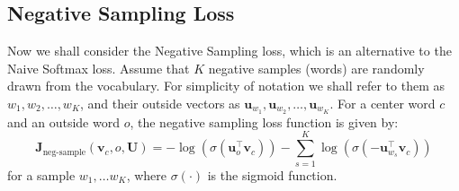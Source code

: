 \documentclass{assignment format}
\begin{document}
\subsection{Negative Sampling Loss}
Now we shall consider the Negative Sampling loss, which is an alternative to the Naive Softmax loss.  Assume that $K$ negative samples (words) are randomly drawn from the vocabulary. For simplicity of notation we shall refer to them as $w_1, w_2, \dots, w_K$, and their outside vectors as $\bm u_{w_1}, \bm u_{w_2}, \dots, \bm u_{w_K}$. 
For a center word $c$ and an outside word $o$, the negative sampling loss function is given by:
\begin{equation}
\bm J_{\text{neg-sample}}(\bm v_c, o, \bm U) = -\log(\sigma(\bm u_o^\top \bm v_c)) - \sum_{s=1}^K \log(\sigma(-\bm u_{w_s}^\top \bm v_c))
\label{negsample}
\end{equation}
for a sample $w_1, \ldots w_K$, where $\sigma(\cdot)$ is the sigmoid function.
\end{document}
